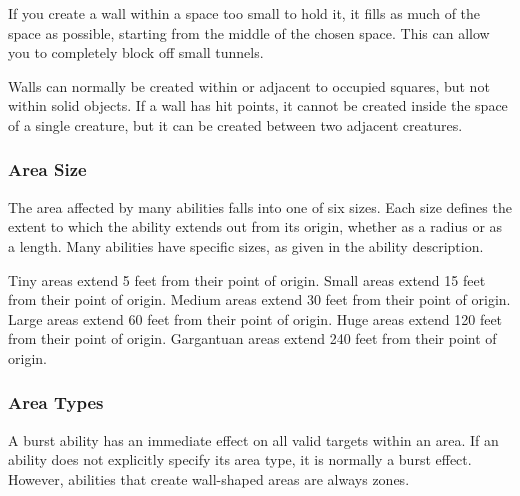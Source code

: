            If you create a wall within a space too small to hold it, it fills as much of the space as possible, starting from the middle of the chosen space.
            This can allow you to completely block off small tunnels.

            Walls can normally be created within or adjacent to occupied squares, but not within solid objects.
            If a wall has hit points, it cannot be created inside the space of a single creature, but it can be created between two adjacent creatures.


        \subsubsection{Area Size}

            The area affected by many abilities falls into one of six sizes.
            Each size defines the extent to which the ability extends out from its origin, whether as a radius or as a length.
            Many abilities have specific sizes, as given in the ability description.

             Tiny areas extend 5 feet from their point of origin.
             Small areas extend 15 feet from their point of origin.
             Medium areas extend 30 feet from their point of origin.
             Large areas extend 60 feet from their point of origin.
             Huge areas extend 120 feet from their point of origin.
             Gargantuan areas extend 240 feet from their point of origin.

        \subsubsection{Area Types}\label{Area Types}

             A burst ability has an immediate effect on all valid targets within an area.
            If an ability does not explicitly specify its area type, it is normally a burst effect.
            However, abilities that create wall-shaped areas are always zones.

